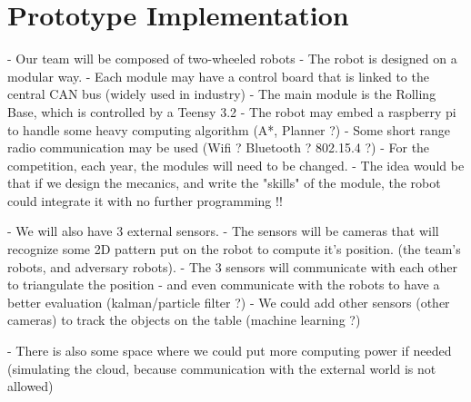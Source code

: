 \section{Prototype Implementation}

 - Our team will be composed of two-wheeled robots
 - The robot is designed on a modular way.
 - Each module may have a control board that is linked to the central CAN bus (widely used in industry)
 - The main module is the Rolling Base, which is controlled by a Teensy 3.2
 - The robot may embed a raspberry pi to handle some heavy computing algorithm (A*, Planner ?)
 - Some short range radio communication may be used (Wifi ? Bluetooth ? 802.15.4 ?)
 - For the competition, each year, the modules will need to be changed.
 - The idea would be that if we design the mecanics, and write the "skills" of the module, the robot could integrate it with no further programming !!

 - We will also have 3 external sensors.
 - The sensors will be cameras that will recognize some 2D pattern put on the robot to compute it's position. (the team's robots, and adversary robots).
 - The 3 sensors will communicate with each other to triangulate the position
 - and even communicate with the robots to have a better evaluation (kalman/particle filter ?)
 - We could add other sensors (other cameras) to track the objects on the table (machine learning ?)
 
 - There is also some space where we could put more computing power if needed (simulating the cloud, because communication with the external world is not allowed)
